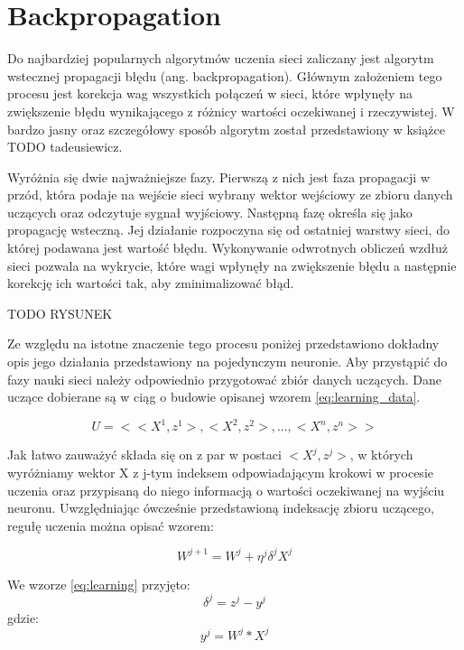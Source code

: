 \section{Backpropagation}

Do najbardziej popularnych algorytmów uczenia sieci zaliczany jest algorytm wstecznej propagacji błędu (ang. backpropagation). Głównym założeniem tego procesu jest korekcja wag wszystkich połączeń w sieci, które wpłynęły na zwiększenie błędu wynikającego z różnicy wartości oczekiwanej i rzeczywistej. W bardzo jasny oraz szczegółowy sposób algorytm został przedstawiony w książce TODO tadeusiewicz. %

Wyróżnia się dwie najważniejsze fazy. Pierwszą z nich jest faza propagacji w przód, która podaje na wejście sieci wybrany wektor wejściowy ze zbioru danych uczących oraz odczytuje sygnał wyjściowy. Następną fazę określa się jako propagację wsteczną. Jej działanie rozpoczyna się od ostatniej warstwy sieci, do której podawana jest wartość błędu. Wykonywanie odwrotnych obliczeń wzdłuż sieci pozwala na wykrycie, które wagi wpłynęły na zwiększenie błędu a następnie korekcję ich wartości tak, aby zminimalizować błąd.

TODO RYSUNEK

Ze względu na istotne znaczenie tego procesu poniżej przedstawiono dokładny opis jego działania przedstawiony na pojedynczym neuronie.
Aby przystąpić do fazy nauki sieci należy odpowiednio przygotować zbiór danych uczących. Dane uczące dobierane są w ciąg o budowie opisanej wzorem \ref{eq:learning_data}.

\begin{equation}
U = <<X^{1}, z^{1}>, <X^{2}, z^{2}>,...,<X^{n}, z^{n}>>
\label{eq:learning_data}
\end{equation}

Jak łatwo zauważyć składa się on z par w postaci $<X^{j}, z^{j}>$, w których wyróżniamy wektor X z j-tym indeksem odpowiadającym krokowi w procesie uczenia oraz przypisaną do niego informacją o wartości oczekiwanej na wyjściu neuronu. Uwzględniając ówcześnie przedstawioną indeksację zbioru uczącego, regułę uczenia można opisać wzorem:

\begin{equation}
W^{j+1} = W^{j} + \eta^{j} \delta^{j} X^{j}
\label{eq:learning}
\end{equation}

We wzorze \ref{eq:learning} przyjęto:
\begin{equation}
\delta^{j} = z^{j} - y^{j}
\label{eq:delta}
\end{equation}
gdzie:
\begin{equation}
y^{j} = W^{j} * X^{j}
\label{eq:output}
\end{equation}

